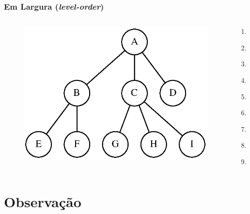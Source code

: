 \documentclass[aspectratio=169]{beamer}
\begin{document}
\begin{frame}\frametitle{Em Largura (\emph{level-order})}
\begin{columns}[T]
\begin{column}{0.7\linewidth}
\begin{figure}[h]
	\centering
	\includegraphics[height=0.5\paperheight]{imagens/arvore_d.eps}
\end{figure}
\end{column}
\begin{column}{0.3\linewidth}
\pause
\begin{enumerate}
	\item A
	\item B
	\item C
	\item D
	\item E
	\item F
	\item G
	\item H
	\item I
\end{enumerate}
\end{column}
\end{columns}
\end{frame}

\section{Observação}
\end{document}
